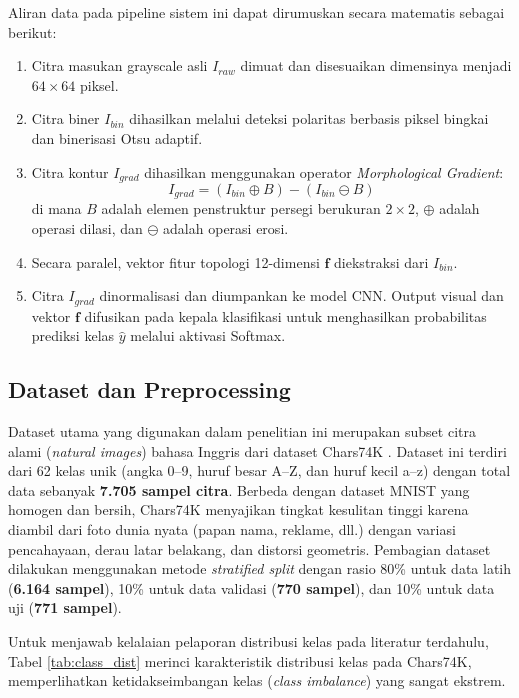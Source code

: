 \documentclass[journal]{IEEEtran}
\begin{document}
Aliran data pada pipeline sistem ini dapat dirumuskan secara matematis sebagai berikut:
\begin{enumerate}
    \item Citra masukan grayscale asli $I_{raw}$ dimuat dan disesuaikan dimensinya menjadi $64 \times 64$ piksel.
    \item Citra biner $I_{bin}$ dihasilkan melalui deteksi polaritas berbasis piksel bingkai dan binerisasi Otsu adaptif.
    \item Citra kontur $I_{grad}$ dihasilkan menggunakan operator \textit{Morphological Gradient}:
    \begin{equation}
    I_{grad} = (I_{bin} \oplus B) - (I_{bin} \ominus B)
    \label{eq:morph_grad}
    \end{equation}
    di mana $B$ adalah elemen penstruktur persegi berukuran $2 \times 2$, $\oplus$ adalah operasi dilasi, dan $\ominus$ adalah operasi erosi.
    \item Secara paralel, vektor fitur topologi 12-dimensi $\mathbf{f}$ diekstraksi dari $I_{bin}$.
    \item Citra $I_{grad}$ dinormalisasi dan diumpankan ke model CNN. Output visual dan vektor $\mathbf{f}$ difusikan pada kepala klasifikasi untuk menghasilkan probabilitas prediksi kelas $\hat{y}$ melalui aktivasi Softmax.
\end{enumerate}

\subsection{Dataset dan Preprocessing}
Dataset utama yang digunakan dalam penelitian ini merupakan subset citra alami (\textit{natural images}) bahasa Inggris dari dataset Chars74K \cite{decampos2009character}. Dataset ini terdiri dari 62 kelas unik (angka 0--9, huruf besar A--Z, dan huruf kecil a--z) dengan total data sebanyak \textbf{7.705 sampel citra}. Berbeda dengan dataset MNIST yang homogen dan bersih, Chars74K menyajikan tingkat kesulitan tinggi karena diambil dari foto dunia nyata (papan nama, reklame, dll.) dengan variasi pencahayaan, derau latar belakang, dan distorsi geometris. Pembagian dataset dilakukan menggunakan metode \textit{stratified split} dengan rasio 80\% untuk data latih (\textbf{6.164 sampel}), 10\% untuk data validasi (\textbf{770 sampel}), dan 10\% untuk data uji (\textbf{771 sampel}).

Untuk menjawab kelalaian pelaporan distribusi kelas pada literatur terdahulu, Tabel \ref{tab:class_dist} merinci karakteristik distribusi kelas pada Chars74K, memperlihatkan ketidakseimbangan kelas (\textit{class imbalance}) yang sangat ekstrem.
\end{document}
